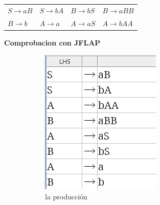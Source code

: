 \documentclass{article}
\begin{document}
            \begin{tabularx}{\textwidth}{XXXX}
                $S \rightarrow aB$ & $S \rightarrow bA$ & $B \rightarrow bS$ & $B \rightarrow aBB$\\
                $B \rightarrow b$ & $A \rightarrow a$ & $A \rightarrow aS$ & $A \rightarrow bAA$\\
            \end{tabularx}

           
            \newpage
            \textbf{Comprobacion con JFLAP}
            \begin{figure}[h] 
            \centering
                \centering
                \begin{subfigure}[b]{0.35\textwidth}
                    \centering
                    \includegraphics[width=\textwidth]{./Imagenes/image1.png}
                    \caption{la producción}
                    \label{fig:label1}
                \end{subfigure}
                \hfill
                \begin{subfigure}[b]{0.55\textwidth}

\end{subfigure}
\end{figure}
\end{document}
